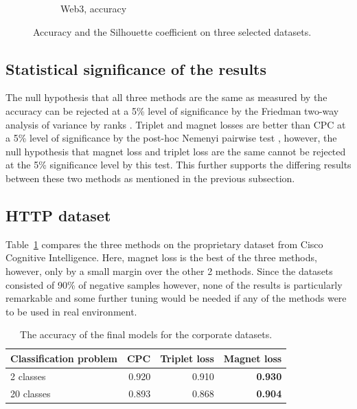\begin{figure}
\begin{subfigure}[t]{0.32\textwidth}
    \caption{Web3, accuracy}
  \end{subfigure}
  \caption{Accuracy and the Silhouette coefficient on three selected datasets.}\label{fig:public-comparison}
\end{figure}

\subsection{Statistical significance of the results}

The null hypothesis that all three methods are the same as measured by the accuracy can be rejected at a 5\% level of significance by the Friedman two-way analysis of variance by ranks \cite{friedman_use_1937}. Triplet and magnet losses are better than CPC at a 5\% level of significance by the post-hoc Nemenyi pairwise test \cite{nemenyi_distribution-free_1963}, however, the null hypothesis that magnet loss and triplet loss are the same cannot be rejected at the 5\% significance level by this test. This further supports the differing results between these two methods as mentioned in the previous subsection.

\subsection{HTTP dataset}

Table~\ref{tab:cisco-accuracy} compares the three methods on the proprietary dataset from Cisco Cognitive Intelligence. Here, magnet loss is the best of the three methods, however, only by a small margin over the other 2 methods. Since the datasets consisted of 90\% of negative samples however, none of the results is particularly remarkable and some further tuning would be needed if any of the methods were to be used in real environment.

\begin{table}
  \centering
  \begin{tabular}{lrrr}
    \toprule
    Classification problem & CPC   & Triplet loss & Magnet loss \\
    \midrule
    2 classes              & 0.920 & 0.910        & \textbf{0.930} \\
    20 classes             & 0.893 & 0.868        & \textbf{0.904} \\
    \bottomrule
  \end{tabular}
  \caption{The accuracy of the final models for the corporate datasets.}\label{tab:cisco-accuracy}
\end{table}
